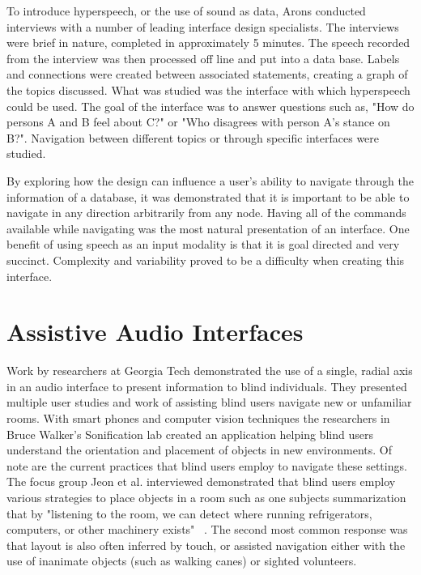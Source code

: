 To introduce hyperspeech, or the use of sound as data, Arons conducted interviews
with a number of leading interface design specialists.  The interviews were
brief in nature, completed in approximately 5 minutes.  The speech recorded
from the interview was then processed off line and put into a data base.
Labels and connections were created between associated statements, creating a
graph of the topics discussed.  What was studied was the interface with which
hyperspeech could be used.  The goal of the interface was to answer questions
such as, "How do persons A and B feel about C?" or "Who disagrees with person
A's stance on B?".  Navigation between different topics or through specific
interfaces were studied.

By exploring how the design can influence a user's ability to navigate through
the information of a database, it was demonstrated that it is important to
be able to navigate in any direction arbitrarily from any node. Having all of
the commands available while navigating was the most natural presentation of
an interface.  One benefit of using speech as an input modality is that it is
goal directed and very succinct.  Complexity and variability proved to be a
difficulty when creating this interface.

\section{                 Assistive Audio Interfaces                           }

Work by researchers at Georgia Tech demonstrated the use of a single, radial axis 
in an audio interface to present information to blind individuals. They presented
multiple user studies and work of assisting blind users navigate new or unfamiliar
rooms.  With smart phones and computer vision techniques the researchers in 
Bruce Walker's Sonification lab created an application helping blind users understand 
the orientation and placement of objects in new environments. Of note are the 
current practices that blind users employ to navigate these settings. The focus group
Jeon et al. interviewed demonstrated that blind users employ 
various strategies to place objects in a room such as one subjects summarization 
that by "listening to the room, we can detect where running refrigerators, 
computers, or other machinery exists" ~\cite{jeon2012listen2droom}. The second 
most common response was that layout is also often inferred by touch, or assisted
navigation either with the use of inanimate objects (such as walking canes) 
or sighted volunteers. 

